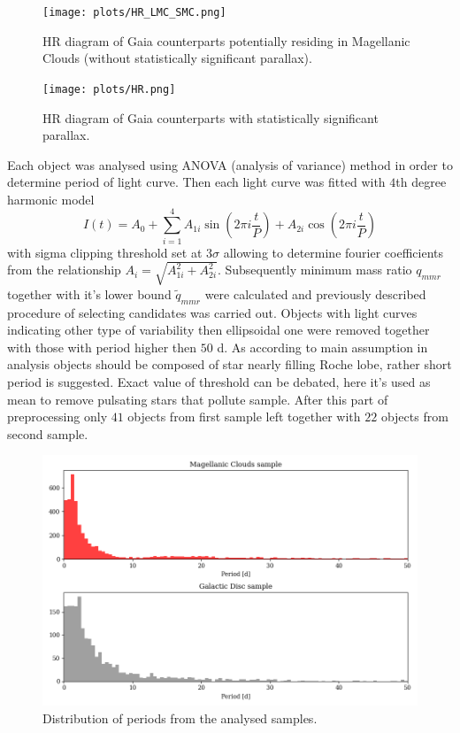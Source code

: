 \documentclass{pracalicmgr}
\begin{document}
\begin{figure}[H]
    \begin{center}
        \texttt{[image: plots/HR\_LMC\_SMC.png]}
    \end{center}
    \caption{HR diagram of Gaia counterparts potentially residing in Magellanic Clouds (without statistically significant parallax).}
\end{figure}

\begin{figure}[H]
    \begin{center}
        \texttt{[image: plots/HR.png]}
    \end{center}
    \caption{HR diagram of Gaia counterparts with statistically significant parallax.}
\end{figure}

Each object was analysed using ANOVA (analysis of variance) method \citep{schwarzenberg-czerny_advantage_1989} in order to determine period of light curve.
Then each light curve was fitted with $4$th degree harmonic model
\begin{equation}\label{harm}
    I(t)=A_0+\sum_{i=1}^4 A_{1i}\sin{\left(2\pi i\frac{t}{P}\right)}+A_{2i}\cos{\left(2\pi i\frac{t}{P}\right)}
\end{equation}
with sigma clipping threshold set at $3\sigma$ allowing to determine fourier coefficients from the relationship $A_i=\sqrt{A_{1i}^2+A_{2i}^2}$.
 Subsequently minimum mass ratio $q_{mmr}$ together with it's lower bound $\tilde{q}_{mmr}$ were calculated and previously described procedure of selecting candidates was carried out.
Objects with light curves indicating other type of variability then ellipsoidal one were removed together with those with period higher then
$50$ d. As according to main assumption in analysis objects should be composed of star nearly filling Roche lobe, rather short period is suggested. Exact value of threshold can be debated, here it's used as mean to 
remove pulsating stars that pollute sample. After this part of preprocessing only $41$ objects from first sample left together with $22$ objects from second sample.
\begin{figure}
    \includegraphics[scale=0.5]{plots/periods.png}
    \caption{Distribution of periods from the analysed samples.}
\end{figure}
\end{document}
